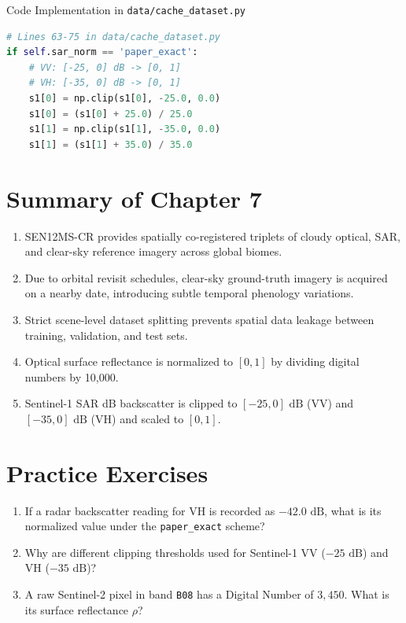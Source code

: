 \begin{codebox}{Code Implementation in \texttt{data/cache\_dataset.py}}
\begin{lstlisting}[language=Python]
# Lines 63-75 in data/cache_dataset.py
if self.sar_norm == 'paper_exact':
    # VV: [-25, 0] dB -> [0, 1]
    # VH: [-35, 0] dB -> [0, 1]
    s1[0] = np.clip(s1[0], -25.0, 0.0)
    s1[0] = (s1[0] + 25.0) / 25.0
    s1[1] = np.clip(s1[1], -35.0, 0.0)
    s1[1] = (s1[1] + 35.0) / 35.0
\end{lstlisting}
\end{codebox}

\section{Summary of Chapter 7}
\begin{enumerate}
    \item SEN12MS-CR provides spatially co-registered triplets of cloudy optical, SAR, and clear-sky reference imagery across global biomes.
    \item Due to orbital revisit schedules, clear-sky ground-truth imagery is acquired on a nearby date, introducing subtle temporal phenology variations.
    \item Strict scene-level dataset splitting prevents spatial data leakage between training, validation, and test sets.
    \item Optical surface reflectance is normalized to $[0, 1]$ by dividing digital numbers by 10,000.
    \item Sentinel-1 SAR dB backscatter is clipped to $[-25, 0]\text{ dB}$ (VV) and $[-35, 0]\text{ dB}$ (VH) and scaled to $[0, 1]$.
\end{enumerate}

\section{Practice Exercises}
\begin{enumerate}
    \item If a radar backscatter reading for VH is recorded as $-42.0\text{ dB}$, what is its normalized value under the \texttt{paper\_exact} scheme?
    \item Why are different clipping thresholds used for Sentinel-1 VV ($-25\text{ dB}$) and VH ($-35\text{ dB}$)?
    \item A raw Sentinel-2 pixel in band \texttt{B08} has a Digital Number of $3{,}450$. What is its surface reflectance $\rho$?
\end{enumerate}

